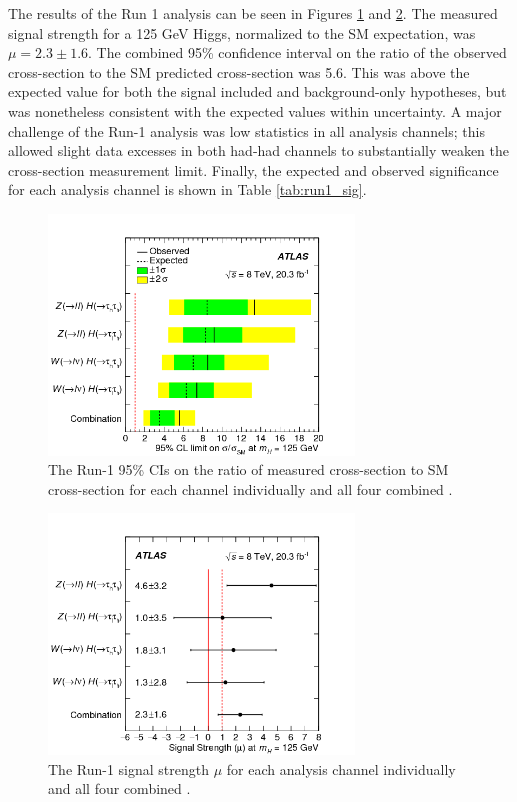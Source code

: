 The results of the Run 1 analysis can be seen in Figures \ref{fig:conf_int} and \ref{fig:sig_stren}. The measured signal strength for a 125 GeV Higgs, normalized to the SM expectation, was $\mu=2.3\pm1.6$. The combined 95\% confidence interval on the ratio of the observed cross-section to the SM predicted cross-section was 5.6. This was above the expected value for both the signal included and background-only hypotheses, but was nonetheless consistent with the expected values within uncertainty. A major challenge of the Run-1 analysis was low statistics in all analysis channels; this allowed slight data excesses in both had-had channels to substantially weaken the cross-section measurement limit. Finally, the expected and observed significance for each analysis channel is shown in Table \ref{tab:run1_sig}.\\

\begin{figure}[htb!]
    \centering
    \includegraphics[width=3.2in]{figures/chapter6/conf_intervals_run1.png}
    \caption{The Run-1 95\% CIs on the ratio of measured cross-section to SM cross-section for each channel individually and all four combined \cite{vh_run1_paper}.}
    \label{fig:conf_int}
\end{figure}

\begin{figure}[htb!]
    \centering
    \includegraphics[width=3.2in]{figures/chapter6/sig_strength_run1.png}
    \caption{The Run-1 signal strength $\mu$ for each analysis channel individually and all four combined \cite{vh_run1_paper}.}
    \label{fig:sig_stren}
\end{figure}

